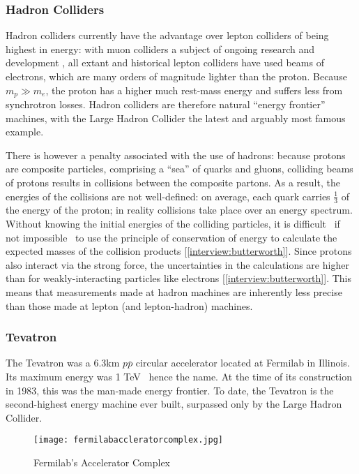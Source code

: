 \subsubsection{Hadron Colliders}
Hadron colliders currently have the advantage over lepton colliders of being highest in energy: with muon colliders a subject of ongoing research and development \cite{Fermi:Muon:Online}, all extant and historical lepton colliders have used beams of electrons, which are many orders of magnitude lighter than the proton. Because $m_{p}\gg m_{e}$, the proton has a higher much rest-mass energy and suffers less from synchrotron losses. Hadron colliders are therefore natural ``energy frontier'' machines, with the Large Hadron Collider the latest and arguably most famous example.

There is however a penalty associated with the use of hadrons: because protons are composite particles, comprising a ``sea'' of quarks and gluons, colliding beams of protons results in collisions between the composite partons. As a result, the energies of the collisions are not well-defined: on average, each quark carries $\frac{1}{3}$ of the energy of the proton; in reality collisions take place over an energy spectrum. Without knowing the initial energies of the colliding particles, it is difficult \textemdash \, if not impossible \textemdash \, to use the principle of conservation of energy to calculate the expected masses of the collision products [\ref{interview:butterworth}]. Since protons also interact via the strong force, the uncertainties in the calculations are higher than for weakly-interacting particles like electrons [\ref{interview:butterworth}]. This means that measurements made at hadron machines are inherently less precise than those made at lepton (and lepton-hadron) machines.
\subsubsection{Tevatron}
The Tevatron was a 6.3km $p\overline{p}$ circular accelerator located at Fermilab in Illinois. Its maximum energy was 1 TeV \textemdash \, hence the name. At the time of its construction in 1983, this was the man-made energy frontier. To date, the Tevatron is the second-highest energy machine ever built, surpassed only by the Large Hadron Collider.

\begin{figure}[!htb]
\centering
\texttt{[image: fermilabaccleratorcomplex.jpg]}
\caption{Fermilab's Accelerator Complex \cite{Tevatron:Antiprotons:Online}}
\end{figure}

